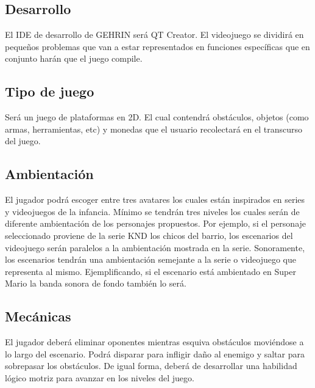 \documentclass{article}
\begin{document}
\subsection{Desarrollo}
%
El IDE de desarrollo de GEHRIN será QT Creator. El videojuego se dividirá en pequeños problemas que van a estar representados en funciones específicas que en conjunto harán que el juego compile. 

\subsection{Tipo de juego}
Será un juego de plataformas en 2D. El cual contendrá obstáculos, objetos (como armas, herramientas, etc) y monedas que el usuario recolectará en el transcurso del juego.  

\subsection{Ambientación}
El jugador podrá escoger entre tres avatares los cuales están inspirados en series y videojuegos de la infancia. Mínimo se tendrán tres niveles los cuales serán de diferente ambientación de los personajes propuestos. Por ejemplo, si el personaje seleccionado proviene de la serie KND los chicos del barrio, los escenarios del videojuego serán paralelos a la ambientación mostrada en la serie. Sonoramente, los escenarios tendrán una ambientación semejante a la serie o videojuego que representa al mismo. Ejemplificando, si el escenario está ambientado en Super Mario la banda sonora de fondo también lo será.
\subsection{Mecánicas}
El jugador deberá eliminar oponentes mientras esquiva obstáculos moviéndose a lo largo del escenario. Podrá disparar para infligir daño al enemigo y saltar para sobrepasar los obstáculos. 
De igual forma, deberá de desarrollar una habilidad lógico motriz para avanzar en los niveles del juego. 



\end{document}
